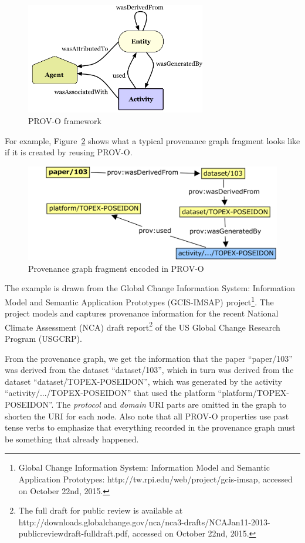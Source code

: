 \begin{figure}
	\centering
	\includegraphics[width=0.7\textwidth]{prov-o.png}
	\caption{PROV-O framework}
	\label{fig:prov-o}
\end{figure}
For example, Figure~\ref{fig:gcis} shows what a typical provenance graph fragment looks like if it is created by reusing PROV-O.
\begin{figure}
	\includegraphics[width=\textwidth]{gcis-prov.png}
	\caption{Provenance graph fragment encoded in PROV-O}
	\label{fig:gcis}
\end{figure}
The example is drawn from the Global Change Information System: Information Model and Semantic Application Prototypes (GCIS-IMSAP) project\footnote{Global Change Information System: Information Model and Semantic Application Prototypes: http://tw.rpi.edu/web/project/gcis-imsap, accessed on October 22nd, 2015.}. The project models and captures provenance information for the recent National Climate Assessment (NCA) draft report\footnote{The full draft for public review is available at http://downloads.globalchange.gov/nca/nca3-drafts/NCAJan11-2013-publicreviewdraft-fulldraft.pdf, accessed on October 22nd, 2015.} of the US Global Change Research Program (USGCRP).

From the provenance graph, we get the information that the paper ``paper/103'' was derived from the dataset ``dataset/103'', which in turn was derived from the dataset ``dataset/TOPEX-POSEIDON'', which was generated by the activity ``activity/.../TOPEX-POSEIDON'' that used the platform ``platform/TOPEX-POSEIDON''. The \emph{protocol} and \emph{domain} URI parts are omitted in the graph to shorten the URI for each node. Also note that all PROV-O properties use past tense verbs to emphasize that everything recorded in the provenance graph must be something that already happened.


